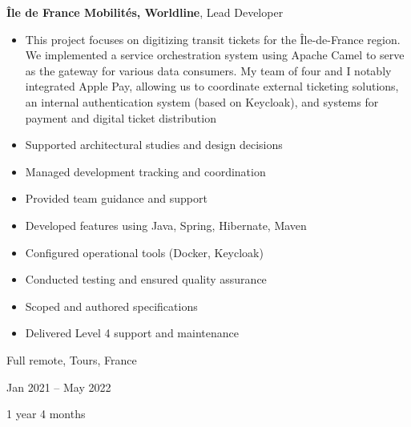 \documentclass[10pt, letterpaper]{article}
\newenvironment{highlights}{
    \begin{itemize}[
        topsep=0.10 cm,
        parsep=0.10 cm,
        partopsep=0pt,
        itemsep=0pt,
        leftmargin=0.4 cm + 10pt
    ]
}{
    \end{itemize}
} %
\newenvironment{twocolentry}[2][]{
    \onecolentry
    \def\secondColumn{#2}
    \setcolumnwidth{\fill, 4.5 cm}
    \begin{paracol}{2}
}{
    \switchcolumn \raggedleft \secondColumn
    \end{paracol}
    \endonecolentry
} %
\begin{document}
        \begin{twocolentry}{
            Full remote, Tours, France

        Jan 2021 – May 2022

        1 year 4 months
        }
            \textbf{Île de France Mobilités, Worldline}, Lead Developer
            \begin{highlights}
                \item This project focuses on digitizing transit tickets for the Île-de-France region. We implemented a service orchestration system using Apache Camel to serve as the gateway for various data consumers. My team of four and I notably integrated Apple Pay, allowing us to coordinate external ticketing solutions, an internal authentication system (based on Keycloak), and systems for payment and digital ticket distribution
                \item Supported architectural studies and design decisions
                \item Managed development tracking and coordination
                \item Provided team guidance and support
                \item Developed features using Java, Spring, Hibernate, Maven
                \item Configured operational tools (Docker, Keycloak)
                \item Conducted testing and ensured quality assurance
                \item Scoped and authored specifications
                \item Delivered Level 4 support and maintenance
            \end{highlights}
        \end{twocolentry}


        \vspace{0.2 cm}
\end{document}
